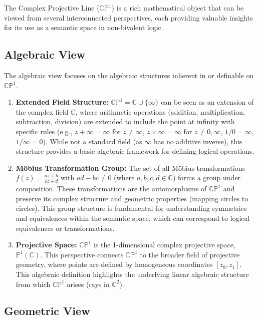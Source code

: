 \documentclass{article}
\begin{document}
	The Complex Projective Line ($\mathbb{CP}^1$) is a rich mathematical object that can be viewed from several interconnected perspectives, each providing valuable insights for its use as a semantic space in non-bivalent logic.
	
	\subsection{Algebraic View}
	
	The algebraic view focuses on the algebraic structures inherent in or definable on $\mathbb{CP}^1$.
	
	\begin{enumerate}
		\item \textbf{Extended Field Structure:} $\mathbb{CP}^1 = \mathbb{C} \cup \{\infty\}$ can be seen as an extension of the complex field $\mathbb{C}$, where arithmetic operations (addition, multiplication, subtraction, division) are extended to include the point at infinity with specific rules (e.g., $z + \infty = \infty$ for $z \neq \infty$, $z \times \infty = \infty$ for $z \neq 0, \infty$, $1/0 = \infty$, $1/\infty = 0$). While not a standard field (as $\infty$ has no additive inverse), this structure provides a basic algebraic framework for defining logical operations.
		
		\item \textbf{M\"{o}bius Transformation Group:} The set of all M\"{o}bius transformations $f(z) = \frac{az+b}{cz+d}$ with $ad-bc \neq 0$ (where $a, b, c, d \in \mathbb{C}$) forms a group under composition. These transformations are the automorphisms of $\mathbb{CP}^1$ and preserve its complex structure and geometric properties (mapping circles to circles). This group structure is fundamental for understanding symmetries and equivalences within the semantic space, which can correspond to logical equivalences or transformations.
		
		\item \textbf{Projective Space:} $\mathbb{CP}^1$ is the 1-dimensional complex projective space, $\mathbb{P}^1(\mathbb{C})$. This perspective connects $\mathbb{CP}^1$ to the broader field of projective geometry, where points are defined by homogeneous coordinates $[z_0, z_1]$. This algebraic definition highlights the underlying linear algebraic structure from which $\mathbb{CP}^1$ arises (rays in $\mathbb{C}^2$).
	\end{enumerate}
	
	\subsection{Geometric View}
	
\end{document}
